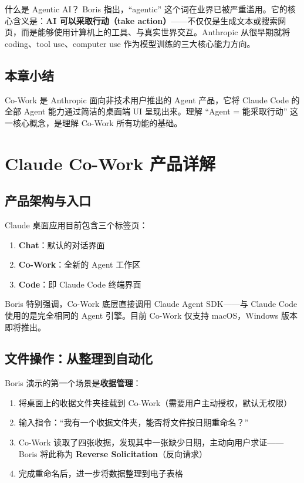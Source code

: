 \documentclass[a4paper]{article}
\begin{document}
\begin{knowledgebox}{什么是 Agentic AI？}
Boris 指出，``agentic'' 这个词在业界已被严重滥用。它的核心含义是：\textbf{AI 可以采取行动（take action）}——不仅仅是生成文本或搜索网页，而是能够使用计算机上的工具、与真实世界交互。Anthropic 从很早期就将 coding、tool use、computer use 作为模型训练的三大核心能力方向。
\end{knowledgebox}

\subsection{本章小结}

Co-Work 是 Anthropic 面向非技术用户推出的 Agent 产品，它将 Claude Code 的全部 Agent 能力通过简洁的桌面端 UI 呈现出来。理解 ``Agent = 能采取行动'' 这一核心概念，是理解 Co-Work 所有功能的基础。

\section{Claude Co-Work 产品详解}

\subsection{产品架构与入口}

Claude 桌面应用目前包含三个标签页：

\begin{enumerate}
    \item \textbf{Chat}：默认的对话界面
    \item \textbf{Co-Work}：全新的 Agent 工作区
    \item \textbf{Code}：即 Claude Code 终端界面
\end{enumerate}

Boris 特别强调，Co-Work 底层直接调用 Claude Agent SDK——与 Claude Code 使用的是完全相同的 Agent 引擎。目前 Co-Work 仅支持 macOS，Windows 版本即将推出。

\subsection{文件操作：从整理到自动化}

Boris 演示的第一个场景是\textbf{收据管理}：

\begin{enumerate}
    \item 将桌面上的收据文件夹挂载到 Co-Work（需要用户主动授权，默认无权限）
    \item 输入指令：``我有一个收据文件夹，能否将文件按日期重命名？''
    \item Co-Work 读取了四张收据，发现其中一张缺少日期，主动向用户求证——Boris 将此称为 \textbf{Reverse Solicitation}（反向请求）
    \item 完成重命名后，进一步将数据整理到电子表格
\end{enumerate}
\end{document}
